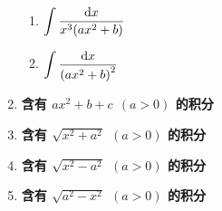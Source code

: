 \begin{enumerate}[label=\arabic{*}.]
\begin{enumerate}[label=\roman{*}.]
            \item $\displaystyle \int\dfrac{\dd x}{x^3\qty(ax^2+b)}$
            \item $\displaystyle \int\dfrac{\dd x}{\qty(ax^2+b)^2}$
          \end{enumerate}
    \item \textbf{含有 $ax^2+b+c~~(a>0)$ 的积分}
    \item \textbf{含有 $\sqrt{x^2+a^2}~~(a>0)$ 的积分}
    \item \textbf{含有 $\sqrt{x^2-a^2}~~(a>0)$ 的积分}
    \item \textbf{含有 $\sqrt{a^2-x^2}~~(a>0)$ 的积分}
\end{enumerate}

